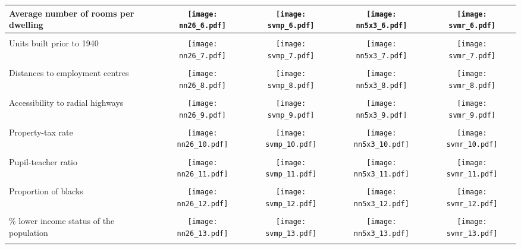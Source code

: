 \begin{tiny}
\begin{longtable}{p{2.5cm}||cccc}
  Average number of rooms per dwelling &
    \texttt{[image: nn26\_6.pdf]}
  &
    \texttt{[image: svmp\_6.pdf]}
  &
    \texttt{[image: nn5x3\_6.pdf]}
  &
    \texttt{[image: svmr\_6.pdf]}
  \\
  \hline \\
  Units built prior to 1940 &
    \texttt{[image: nn26\_7.pdf]}
  &
    \texttt{[image: svmp\_7.pdf]}
  &
    \texttt{[image: nn5x3\_7.pdf]}
  &
    \texttt{[image: svmr\_7.pdf]}
  \\
  \hline \\
  Distances to employment centres &
    \texttt{[image: nn26\_8.pdf]}
  &
    \texttt{[image: svmp\_8.pdf]}
  &
    \texttt{[image: nn5x3\_8.pdf]}
  &
    \texttt{[image: svmr\_8.pdf]}
  \\
  \hline \\
  Accessibility to radial highways &
    \texttt{[image: nn26\_9.pdf]}
  &
    \texttt{[image: svmp\_9.pdf]}
  &
    \texttt{[image: nn5x3\_9.pdf]}
  &
    \texttt{[image: svmr\_9.pdf]}
  \\
  \hline \\
  Property-tax rate &
    \texttt{[image: nn26\_10.pdf]}
  &
    \texttt{[image: svmp\_10.pdf]}
  &
    \texttt{[image: nn5x3\_10.pdf]}
  &
    \texttt{[image: svmr\_10.pdf]}
  \\
  \hline \\
  Pupil-teacher ratio &
    \texttt{[image: nn26\_11.pdf]}
  &
    \texttt{[image: svmp\_11.pdf]}
  &
    \texttt{[image: nn5x3\_11.pdf]}
  &
    \texttt{[image: svmr\_11.pdf]}
  \\
  \hline \\
  Proportion of blacks &
    \texttt{[image: nn26\_12.pdf]}
  &
    \texttt{[image: svmp\_12.pdf]}
  &
    \texttt{[image: nn5x3\_12.pdf]}
  &
    \texttt{[image: svmr\_12.pdf]}
  \\
  \hline \\
  \% lower income status of the population &
    \texttt{[image: nn26\_13.pdf]}
  &
    \texttt{[image: svmp\_13.pdf]}
  &
    \texttt{[image: nn5x3\_13.pdf]}
  &
    \texttt{[image: svmr\_13.pdf]}
  \\
  \hline \\
\end{longtable}
\end{tiny}


